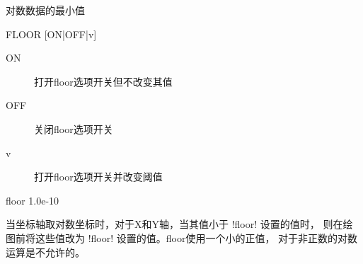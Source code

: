 \label{cmd:floor}

对数数据的最小值

\begin{SACSTX}
FLOOR [ON|OFF|v]
\end{SACSTX}

\begin{description}
\item [ON] 打开floor选项开关但不改变其值
\item [OFF] 关闭floor选项开关
\item [v] 打开floor选项开关并改变阈值
\end{description}

\begin{SACDFT}
floor 1.0e-10
\end{SACDFT}

当坐标轴取对数坐标时，对于X和Y轴，当其值小于 !floor! 设置的值时，
则在绘图前将这些值改为 !floor! 设置的值。floor使用一个小的正值，
对于非正数的对数运算是不允许的。
